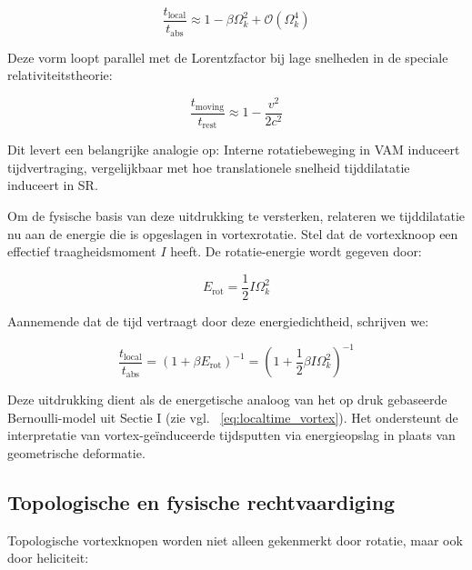 \begin{equation}
\frac{t_{\text{local}}}{t_{\text{abs}}} \approx 1 - \beta \Omega_k^2 + \mathcal{O}(\Omega_k^4)\label{eq:rotational_induced_time_dilation_expansion}
\end{equation}

Deze vorm loopt parallel met de Lorentzfactor bij lage snelheden in de speciale relativiteitstheorie:

\begin{equation}
\frac{t_{\text{moving}}}{t_{\text{rest}}} \approx 1 - \frac{v^2}{2c^2}\label{eq:parallels_lorentz_time_dilation}
\end{equation}

Dit levert een belangrijke analogie op: Interne rotatiebeweging in VAM induceert tijdvertraging, vergelijkbaar met hoe translationele snelheid tijddilatatie induceert in SR.

Om de fysische basis van deze uitdrukking te versterken, relateren we tijddilatatie nu aan de energie die is opgeslagen in vortexrotatie. Stel dat de vortexknoop een effectief traagheidsmoment $I$ heeft. De rotatie-energie wordt gegeven door:

\begin{equation}
E_{\text{rot}} = \frac{1}{2} I \Omega_k^2\label{eq:rotational_energy_inertia}
\end{equation}

Aannemende dat de tijd vertraagt ​​door deze energiedichtheid, schrijven we:

\begin{equation}
\frac{t_{\text{local}}}{t_{\text{abs}}} = \left(1 + \beta E_{\text{rot}} \right)^{-1} = \left(1 + \frac{1}{2} \beta I \Omega_k^2 \right)^{-1}\label{eq:time_dilation_rotational_energy_inertia}
\end{equation}

Deze uitdrukking dient als de energetische analoog van het op druk gebaseerde Bernoulli-model uit Sectie I (zie vgl. ~\eqref{eq:localtime_vortex}). Het ondersteunt de interpretatie van vortex-geïnduceerde tijdsputten via energieopslag in plaats van geometrische deformatie.

\subsection{Topologische en fysische rechtvaardiging}

Topologische vortexknopen worden niet alleen gekenmerkt door rotatie, maar ook door heliciteit:

